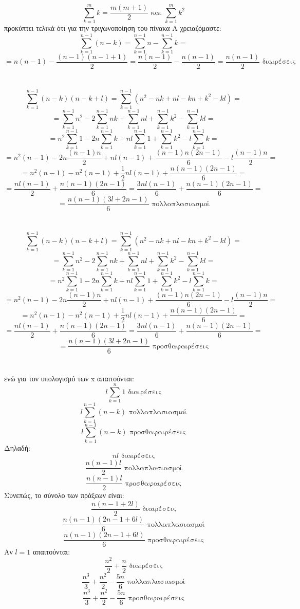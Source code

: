 \documentclass[12pt]{article}
\begin{document}
$$
\sum_{k=1}^{m}k = \frac{m(m+1)}{2} \mbox{ και } \sum_{k=1}^{m}k^2
$$
προκύπτει τελικά ότι για την τριγωνοποίηση του πίνακα Α χρειαζόμαστε:
$$ \sum_{k=1}^{n-1} {(n-k)} = \sum_{k=1}^{n-1}n - \sum_{k=1}^{n-1}k = $$
$$ = n(n-1) - \frac{(n-1)(n-1+1)}{2} = \frac{n(n-1)}{2} - \frac{n(n-1)}{2} = \frac{n(n-1)}{2}	\mbox{	διαιρέσεις}$$ \\ \\
$$\sum_{k=1}^{n-1} {(n-k)(n-k+l)} = \sum_{k=1}^{n-1}{(n^2-nk+nl-kn+k^2-kl)} = $$
$$ = \sum_{k=1}^{n-1}n^2 - 2\sum_{k=1}^{n-1}{nk} + \sum_{k=1}^{n-1}{nl} + \sum_{k=1}^{n-1}k^2 - \sum_{k=1}^{n-1}{kl} = $$
$$ = n^2\sum_{k=1}^{n-1}1 -2n\sum_{k=1}^{n-1}k +nl\sum_{k=1}^{n-1}1 + \sum_{k=1}^{n-1}k^2 - l\sum_{k=1}^{n-1}k = $$
$$ = n^2(n-1) - 2n\frac{(n-1)n}{2} + nl(n-1) + \frac{(n-1)n(2n-1)}{6} - l\frac{(n-1)n}{2} = $$
$$ = n^2(n-1) - n^2(n-1) + \frac{1}{2}nl(n-1) + \frac{n(n-1)(2n-1)}{6} = $$
$$ = \frac{nl(n-1)}{2} + \frac{n(n-1)(2n-1)}{6} = \frac{3nl(n-1)}{6} + \frac{n(n-1)(2n-1)}{6} = $$ $$ = \frac{n(n-1)(3l+2n-1)}{6} \mbox{	πολλαπλασιασμοί} $$ \\ \\
$$\sum_{k=1}^{n-1} {(n-k)(n-k+l)} = \sum_{k=1}^{n-1}{(n^2-nk+nl-kn+k^2-kl)} = $$
$$ = \sum_{k=1}^{n-1}n^2 - 2\sum_{k=1}^{n-1}{nk} + \sum_{k=1}^{n-1}{nl} + \sum_{k=1}^{n-1}k^2 - \sum_{k=1}^{n-1}{kl} = $$
$$ = n^2\sum_{k=1}^{n-1}1 -2n\sum_{k=1}^{n-1}k +nl\sum_{k=1}^{n-1}1 + \sum_{k=1}^{n-1}k^2 - l\sum_{k=1}^{n-1}k = $$
$$ = n^2(n-1) - 2n\frac{(n-1)n}{2} + nl(n-1) + \frac{(n-1)n(2n-1)}{6} - l\frac{(n-1)n}{2} = $$
$$ = n^2(n-1) - n^2(n-1) + \frac{1}{2}nl(n-1) + \frac{n(n-1)(2n-1)}{6} = $$
$$ = \frac{nl(n-1)}{2} + \frac{n(n-1)(2n-1)}{6} = \frac{3nl(n-1)}{6} + \frac{n(n-1)(2n-1)}{6} = $$ $$ = \frac{n(n-1)(3l+2n-1)}{6} \mbox{	προσθαφαιρέσεις} $$ \\ \\

ενώ για τον υπολογισμό των x απαιτούνται: \\

$$ l\sum_{k=1}^{n}1 \mbox{ διαιρέσεις}$$
$$ l\sum_{k=1}^{n-1}{(n-k)} \mbox{ πολλαπλασιασμοί}$$
$$ l\sum_{k=1}^{n-1}{(n-k)} \mbox{ προσθαφαιρέσεις}$$
Δηλαδή:
$$ nl \mbox{ διαιρέσεις} $$
$$ \frac{n(n-1)l}{2} \mbox{ πολλαπλασιασμοί}$$
$$ \frac{n(n-1)l}{2} \mbox{ προσθαφαιρέσεις}$$
Συνεπώς, το σύνολο των πράξεων είναι:
$$ \frac{n(n-1+2l)}{2} \mbox{ διαιρέσεις} $$
$$ \frac{n(n-1)(2n-1+6l)}{6} \mbox{ πολλαπλασιασμοί}$$
$$ \frac{n(n-1)(2n-1+6l)}{6} \mbox{ προσθαφαιρέσεις}$$
Αν $l=1$ απαιτούνται:
$$ \frac{n^2}{2} + \frac{n}{2} \mbox{ διαιρέσεις}$$
$$ \frac{n^3}{3} + \frac{n^2}{2} - \frac{5n}{6} \mbox{ πολλαπλασιασμοί}$$
$$ \frac{n^3}{3} + \frac{n^2}{2} - \frac{5n}{6} \mbox{ προσθαφαιρέσεις}$$
\end{document}
